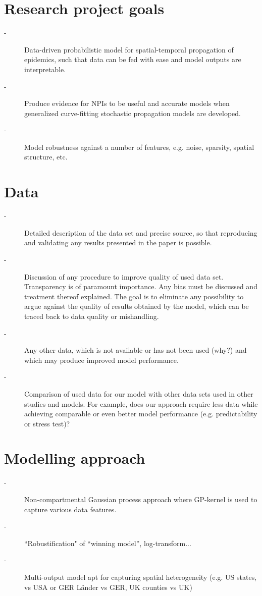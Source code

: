 \documentclass[11pt,a4paper,amssymb,amsmath, tightenlines]{article}
\numberwithin{equation}{section}
\begin{document}
\section{Research project goals}
\begin{description}
	\item[-] Data-driven probabilistic model for spatial-temporal propagation of epidemics, such that data can be fed with ease and model outputs are interpretable.
	\item[-] Produce evidence for NPIs to be useful and accurate models when generalized curve-fitting stochastic propagation models are developed. 
	\item[-] Model robustness against a number of features, e.g. noise, sparsity, spatial structure, etc.
\end{description}
\section{Data}
\begin{description}
	\item[-] Detailed description of the data set and precise source, so that reproducing and validating any results presented in the paper is possible. 
	\item[-] Discussion of any procedure to improve quality of used data set. Transparency is of paramount importance. Any bias must be discussed and treatment thereof explained. The goal is to eliminate any possibility to argue against the quality of results obtained by the model, which can be traced back to data quality or mishandling. 
	\item[-] Any other data, which is not available or has not been used (why?) and which may produce improved model performance.
	\item[-] Comparison of used data for our model with other data sets used in other studies and models. For example, does our approach require less data while achieving comparable or even better model performance (e.g. predictability or stress test)?
\end{description}
\section{Modelling approach}
\begin{description}
\item[-] Non-compartmental Gaussian process approach where GP-kernel is used to capture various data features.
\item[-] ``Robustification" of ``winning model'', log-transform...
\item[-] Multi-output model apt for capturing spatial heterogeneity (e.g. US states, vs USA or GER L\"ander vs GER, UK counties vs UK) 
\end{description}
\end{document}
